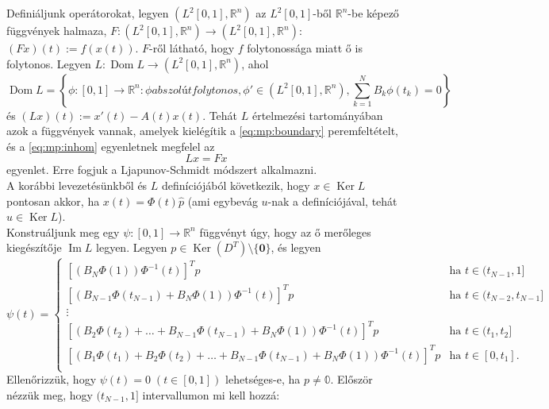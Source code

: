 \documentclass[oneside, titlepage, 12pt, a4paper]{report}
\DeclareMathOperator{\Ima}{Im}	%
\DeclareMathOperator{\Ker}{Ker}	%
\DeclareMathOperator{\Dom}{Dom}	%
\begin{document}
Definiáljunk operátorokat, legyen $( L^2[0, 1], \mathbb{R}^n)$ az $L^2[0, 1]$-ből $\mathbb{R}^n$-be képező függvények halmaza, $F : ( L^2[0, 1], \mathbb{R}^n) \rightarrow ( L^2[0, 1], \mathbb{R}^n)$: $(Fx)(t) := f(x(t))$. $F$-ről látható, hogy $f$ folytonossága miatt ő is folytonos. Legyen $L : \Dom L \rightarrow ( L^2[0, 1], \mathbb{R}^n)$, ahol
\begin{equation*}
\Dom L = \left\{ \phi : [0, 1] \rightarrow \mathbb{R}^n : \phi abszolút folytonos, \phi' \in ( L^2[0, 1], \mathbb{R}^n), \sum_{k = 1}^N B_k \phi(t_k) = 0 \right\}
\end{equation*}
és $(Lx)(t) := x'(t) - A(t) x(t)$. Tehát $L$ értelmezési tartományában azok a függvények vannak, amelyek kielégítik a \eqref{eq:mp:boundary} peremfeltételt, és a \eqref{eq:mp:inhom} egyenletnek megfelel az
\begin{equation}
Lx = Fx \label{eq:mp:operator}
\end{equation}
egyenlet. Erre fogjuk a Ljapunov-Schmidt módszert alkalmazni. \\
A korábbi levezetésünkből és $L$ definíciójából következik, hogy $x \in \Ker L$ pontosan akkor, ha $x(t) = \Phi(t) \hat{p}$ (ami egybevág $u$-nak a definíciójával, tehát $u \in \Ker L$). \\
Konstruáljunk meg egy $\psi : [0, 1] \rightarrow \mathbb{R}^n$ függvényt úgy, hogy az ő merőleges kiegészítője $\Ima L$ legyen. Legyen $p \in \Ker(D^T) \setminus \{ \mathbf{0} \}$, és legyen
\begin{equation*}
\psi(t) = 
	\begin{cases}
	\left[ \left( B_N \Phi(1) \right) \Phi^{-1}(t) \right]^T p &\text{ha } t \in (t_{N-1}, 1] \\
	\left[ \left( B_{N-1} \Phi(t_{N-1}) +  B_N \Phi(1) \right) \Phi^{-1}(t) \right]^T p &\text{ha } t \in (t_{N-2}, t_{N-1}]  \\
	\vdots &\\
	\left[ \left( B_2 \Phi(t_2) + \dots + B_{N-1} \Phi(t_{N-1}) +  B_N \Phi(1) \right) \Phi^{-1}(t) \right]^T p &\text{ha } t \in (t_1, t_2]  \\
	\left[ \left( B_1 \Phi(t_1) + B_2 \Phi(t_2) + \dots + B_{N-1} \Phi(t_{N-1}) +  B_N \Phi(1) \right) \Phi^{-1}(t) \right]^T p &\text{ha } t \in [0, t_1]. \\
	\end{cases}
\end{equation*}
Ellenőrizzük, hogy $\psi(t) = 0 \; (t \in [0, 1])$ lehetséges-e, ha $p \neq \mathbb{0}$. Először nézzük meg, hogy $(t_{N-1}, 1]$ intervallumon mi kell hozzá:
\end{document}
